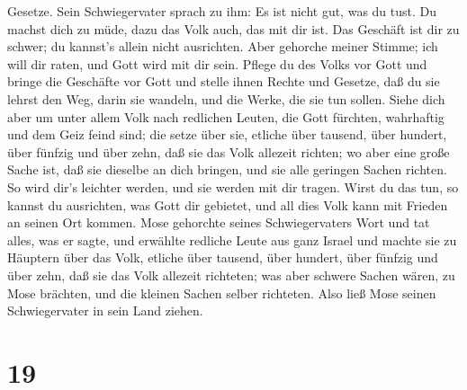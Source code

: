 Gesetze.  Sein Schwiegervater sprach zu ihm: Es ist nicht
gut, was du tust.  Du machst dich zu müde, dazu das Volk
auch, das mit dir ist. Das Geschäft ist dir zu schwer; du kannst's
allein nicht ausrichten.  Aber gehorche meiner Stimme; ich
will dir raten, und Gott wird mit dir sein. Pflege du des Volks vor Gott
und bringe die Geschäfte vor Gott  und stelle ihnen Rechte
und Gesetze, daß du sie lehrst den Weg, darin sie wandeln, und die
Werke, die sie tun sollen.  Siehe dich aber um unter allem
Volk nach redlichen Leuten, die Gott fürchten, wahrhaftig und dem Geiz
feind sind; die setze über sie, etliche über tausend, über hundert, über
fünfzig und über zehn,  daß sie das Volk allezeit richten;
wo aber eine große Sache ist, daß sie dieselbe an dich bringen, und sie
alle geringen Sachen richten. So wird dir's leichter werden, und sie
werden mit dir tragen.  Wirst du das tun, so kannst du
ausrichten, was Gott dir gebietet, und all dies Volk kann mit Frieden an
seinen Ort kommen.  Mose gehorchte seines Schwiegervaters
Wort und tat alles, was er sagte,  und erwählte redliche
Leute aus ganz Israel und machte sie zu Häuptern über das Volk, etliche
über tausend, über hundert, über fünfzig und über zehn, 
daß sie das Volk allezeit richteten; was aber schwere Sachen wären, zu
Mose brächten, und die kleinen Sachen selber richteten. 
Also ließ Mose seinen Schwiegervater in sein Land ziehen.

\hypertarget{section-18}{%
\section{19}\label{section-18}}

